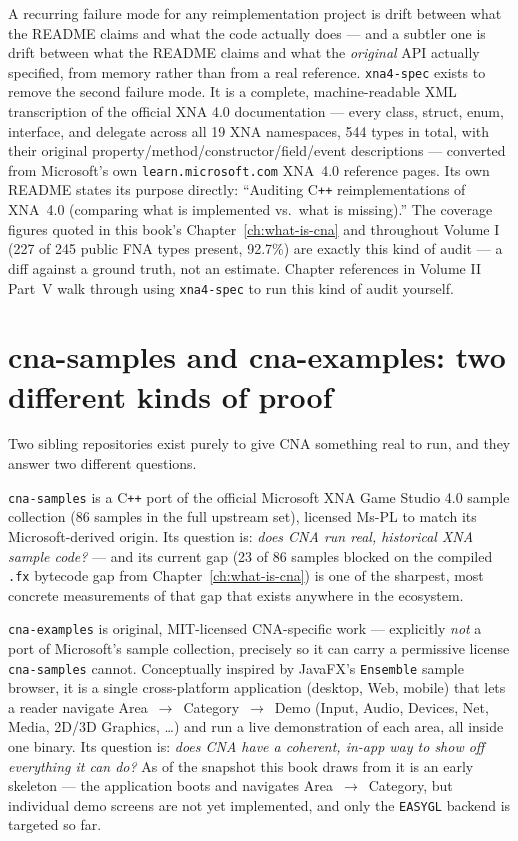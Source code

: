 A recurring failure mode for any reimplementation project is drift between what the README
claims and what the code actually does --- and a subtler one is drift between what the
README claims and what the \emph{original} API actually specified, from memory rather than
from a real reference. \texttt{xna4-spec} exists to remove the second failure mode. It is a
complete, machine-readable XML transcription of the official XNA 4.0 documentation --- every
class, struct, enum, interface, and delegate across all 19 XNA namespaces, 544 types in
total, with their original property/method/constructor/field/event descriptions --- converted
from Microsoft's own \texttt{learn.microsoft.com} XNA~4.0 reference pages. Its own README
states its purpose directly: ``Auditing C\texttt{++} reimplementations of XNA~4.0 (comparing
what is implemented vs.\ what is missing).'' The coverage figures quoted in this book's
Chapter~\ref{ch:what-is-cna} and throughout Volume I (227 of 245 public FNA types present,
92.7\%) are exactly this kind of audit --- a diff against a ground truth, not an estimate.
Chapter references in Volume II Part~V walk through using \texttt{xna4-spec} to run this kind
of audit yourself.

\section{cna-samples and cna-examples: two different kinds of proof}

Two sibling repositories exist purely to give CNA something real to run, and they answer two
different questions.

\texttt{cna-samples} is a C\texttt{++} port of the official Microsoft XNA Game Studio 4.0
sample collection (86 samples in the full upstream set), licensed Ms-PL to match its
Microsoft-derived origin. Its question is: \emph{does CNA run real, historical XNA sample
code?} --- and its current gap (23 of 86 samples blocked on the compiled \texttt{.fx}
bytecode gap from Chapter~\ref{ch:what-is-cna}) is one of the sharpest, most concrete
measurements of that gap that exists anywhere in the ecosystem.

\texttt{cna-examples} is original, MIT-licensed CNA-specific work --- explicitly \emph{not}
a port of Microsoft's sample collection, precisely so it can carry a permissive license
\texttt{cna-samples} cannot. Conceptually inspired by JavaFX's \texttt{Ensemble} sample
browser, it is a single cross-platform application (desktop, Web, mobile) that lets a reader
navigate Area~$\to$~Category~$\to$~Demo (Input, Audio, Devices, Net, Media, 2D/3D Graphics,
\ldots) and run a live demonstration of each area, all inside one binary. Its question is:
\emph{does CNA have a coherent, in-app way to show off everything it can do?} As of the
snapshot this book draws from it is an early skeleton --- the application boots and
navigates Area~$\to$~Category, but individual demo screens are not yet implemented, and only
the \texttt{EASYGL} backend is targeted so far.

